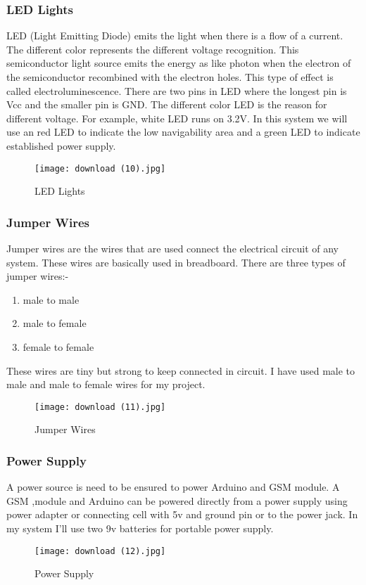 \documentclass[12pt, top = 1 inch, bottom = 1 inch, left = 1.2 inch, top = .8 inch]{book}
\begin{document}
			\subsubsection{LED Lights}
			LED (Light Emitting Diode) emits the light when there is a flow of a current. The different color represents the different voltage recognition. This semiconductor light source emits the energy as like photon when the electron of the semiconductor recombined with the electron holes. This type of effect is called electroluminescence. There are two pins in LED where the longest pin is Vcc and the smaller pin is GND. The different color LED is the reason for different voltage. For example, white LED runs on 3.2V. In this system we will use an red LED to indicate the low navigability area and a green LED to indicate established power supply.
			\begin{figure}[h!]	
				\centering
				\texttt{[image: download (10).jpg]}
				\caption{LED Lights}
			\end{figure}
			\newpage
			\subsubsection{Jumper Wires}
			Jumper wires are the wires that are used connect the electrical circuit of any system. These wires are basically used in breadboard. There are three types of jumper wires:-
			\begin{enumerate}
				\item male to male
				\item male to female
				\item female to female
			\end{enumerate}
			These wires are tiny but strong to keep connected in circuit. I have used male to male and male to female wires for my project. 
			\begin{figure}[h!]	
				\centering
				\texttt{[image: download (11).jpg]}
				\caption{Jumper Wires}
			\end{figure}
			\subsubsection{Power Supply}
			A power source is need to be ensured to power Arduino and GSM module. A GSM ,module and Arduino can be powered directly from a power supply using power adapter or connecting cell with 5v and ground pin or to the power jack. In my system I’ll use two 9v batteries for portable power supply.
			\begin{figure}[h!]	
				\centering
				\texttt{[image: download (12).jpg]}
				\caption{Power Supply}
			\end{figure}
			\newpage
\end{document}
